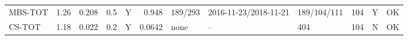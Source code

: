 \documentclass[10pt,a4paper]{article}
\begin{document}
\begin{longtable}{lrrrcrlllrcc}
MBS-TOT & 1.26 & 0.208 & 0.5 & Y & 0.948 & 189/293 & 2016-11-23/2018-11-21 & 189/104/111 & 104 & Y & OK\\
CS-TOT & 1.18 & 0.022 & 0.2 & Y & 0.0642 & none & -- & 404 & 104 & N & OK\\

\end{longtable}
\end{document}
